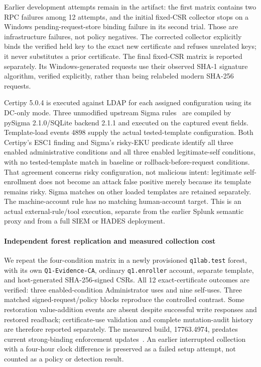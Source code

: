 Earlier development attempts remain in the artifact: the first matrix contains two RPC failures among 12 attempts, and the initial fixed-CSR collector stops on a Windows pending-request-store binding failure in its second trial. Those are infrastructure failures, not policy negatives. The corrected collector explicitly binds the verified held key to the exact new certificate and refuses unrelated keys; it never substitutes a prior certificate. The final fixed-CSR matrix is reported separately. Its Windows-generated requests use their observed SHA-1 signature algorithm, verified explicitly, rather than being relabeled modern SHA-256 requests.

Certipy 5.0.4 is executed against LDAP for each assigned configuration using its DC-only mode. Three unmodified upstream Sigma rules~\cite{sigma2026rules} are compiled by pySigma 2.1.0/SQLite backend 2.1.1 and executed on the captured event fields. Template-load events 4898 supply the actual tested-template configuration. Both Certipy's ESC1 finding and Sigma's risky-EKU predicate identify all three enabled administrative conditions and all three enabled legitimate-self conditions, with no tested-template match in baseline or rollback-before-request conditions. That agreement concerns risky configuration, not malicious intent: legitimate self-enrollment does not become an attack false positive merely because its template remains risky. Sigma matches on other loaded templates are retained separately. The machine-account rule has no matching human-account target. This is an actual external-rule/tool execution, separate from the earlier Splunk semantic proxy and from a full SIEM or HADES deployment.

\paragraph{Independent forest replication and measured collection cost}
We repeat the four-condition matrix in a newly provisioned \texttt{q1lab.test} forest, with its own \texttt{Q1-Evidence-CA}, ordinary \texttt{q1.enroller} account, separate template, and host-generated SHA-256-signed CSRs. All 12 exact-certificate outcomes are verified: three enabled-condition Administrator uses and nine self-uses. Three matched signed-request/policy blocks reproduce the controlled contrast. Some restoration value-addition events are absent despite successful write responses and restored readback; certificate-use validation and complete mutation-audit history are therefore reported separately. The measured build, 17763.4974, predates current strong-binding enforcement updates~\cite{microsoft2025strongbinding}. An earlier interrupted collection with a four-hour clock difference is preserved as a failed setup attempt, not counted as a policy or detection result.

